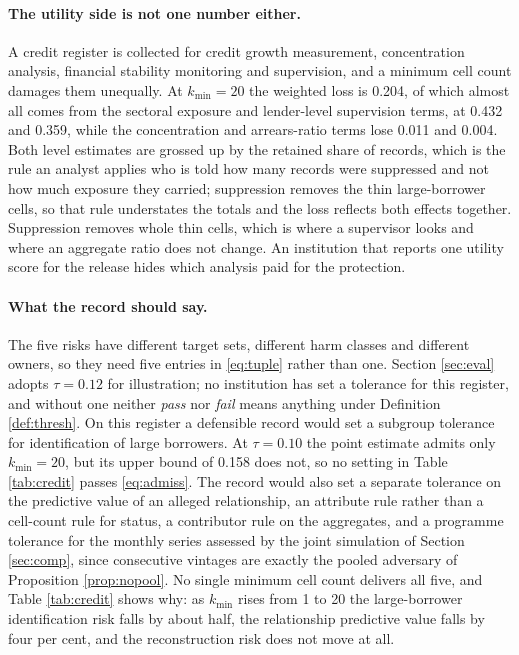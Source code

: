 \documentclass[11pt,a4paper]{article}
\theoremstyle{plain}
\theoremstyle{definition}
\begin{document}
\paragraph{The utility side is not one number either.} A credit register is
collected for credit growth measurement, concentration analysis, financial
stability monitoring and supervision, and a minimum cell count damages them
unequally. At $k_{\min} = 20$ the weighted loss is 0.204, of which almost all comes from the
sectoral exposure and lender-level supervision terms, at 0.432 and 0.359, while the
concentration and arrears-ratio terms lose 0.011 and 0.004. Both level estimates
are grossed up by the retained share of records, which is the rule an analyst
applies who is told how many records were suppressed and not how much exposure they
carried; suppression removes the thin large-borrower cells, so that rule understates
the totals and the loss reflects both effects together.
Suppression removes whole thin cells, which is where a supervisor looks and where
an aggregate ratio does not change. An institution that reports one utility score for the release hides which analysis
paid for the protection.

\paragraph{What the record should say.} The five risks have different target
sets, different harm classes and different owners, so they need five entries in
\eqref{eq:tuple} rather than one. Section \ref{sec:eval} adopts $\tau = 0.12$ for
illustration; no institution has set a tolerance for this register, and without
one neither \textit{pass} nor \textit{fail} means anything under Definition
\ref{def:thresh}. On this register a defensible record would set a subgroup
tolerance for identification of large borrowers. At $\tau = 0.10$ the point
estimate admits only $k_{\min} = 20$, but its upper bound of 0.158 does not, so
no setting in Table \ref{tab:credit} passes \eqref{eq:admiss}. The record would
also set a separate tolerance
on the predictive value of an alleged relationship, an attribute rule rather than
a cell-count rule for status, a contributor rule on the aggregates, and a
programme tolerance for the monthly series assessed by the joint simulation of
Section \ref{sec:comp}, since consecutive vintages are exactly the pooled
adversary of Proposition \ref{prop:nopool}. No single minimum cell count delivers all five, and Table \ref{tab:credit} shows
why: as $k_{\min}$ rises from 1 to 20 the large-borrower identification risk falls
by about half, the relationship predictive value falls by four per cent, and the
reconstruction risk does not move at all.
\end{document}
